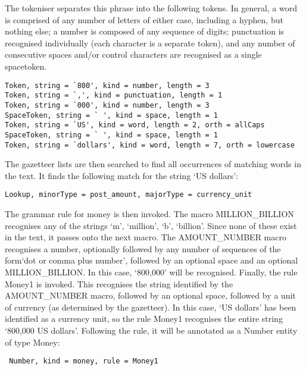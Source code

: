 
The tokeniser separates this phrase into the following tokens. In
general, a word is comprised of any number of letters of either case, including a
hyphen, but nothing else; a number is composed of any sequence of
digits; punctuation is recognised individually (each character is a
separate token), and any number of consecutive spaces
and/or control characters are recognised as a single spacetoken.

\begin{small}
\begin{verbatim}
Token, string = `800', kind = number, length = 3
Token, string = `,', kind = punctuation, length = 1
Token, string = `000', kind = number, length = 3
SpaceToken, string = ` ', kind = space, length = 1
Token, string = `US', kind = word, length = 2, orth = allCaps
SpaceToken, string = ` ', kind = space, length = 1
Token, string = `dollars', kind = word, length = 7, orth = lowercase
\end{verbatim}
\end{small}


The gazetteer lists are then searched to find all occurrences of
matching words in the text. It finds the following match for the
string `US dollars':

\begin{small}
\begin{verbatim}
Lookup, minorType = post_amount, majorType = currency_unit
\end{verbatim}
\end{small}


The grammar rule for money is then invoked.
The macro MILLION\_BILLION recognises any of the strings `m',
`million', `b', `billion'. Since none of these exist in the
text, it passes onto the next macro. The AMOUNT\_NUMBER macro
recognises a number, optionally followed by any number of sequences of
the form`dot or comma plus number', followed by an optional space
and an optional MILLION\_BILLION. In this case, `800,000' will be
recognised. Finally, the rule Money1 is invoked. This recognises the
string identified by the AMOUNT\_NUMBER macro, followed by an optional
space, followed by a unit of currency (as determined by the
gazetteer). In this case, `US dollars' has been identified as a
currency unit, so the rule Money1 recognises
the entire string `800,000 US dollars'. Following the rule, it will
be annotated as a Number entity of type Money:

\begin{small}\begin{verbatim} Number, kind = money, rule = Money1 \end{verbatim}\end{small}











